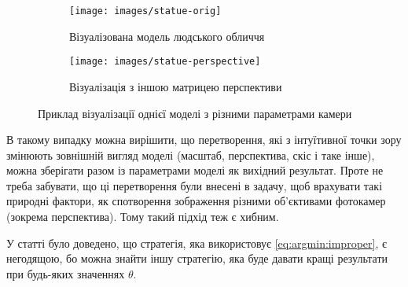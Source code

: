 \begin{figure}[h]
  \centering
  \begin{subfigure}[b]{0.4\textwidth}
    \centering
    \texttt{[image: images/statue-orig]}
    \caption{Візуалізована модель людського обличчя}
    \label{fig:argmin:statue-original}
  \end{subfigure}
  \begin{subfigure}[b]{0.4\textwidth}
    \centering
    \texttt{[image: images/statue-perspective]}
    \caption{Візуалізація з іншою матрицею перспективи}
    \label{fig:argmin:statue-distorted}
  \end{subfigure}
  \caption{Приклад візуалізації однієї моделі з різними параметрами камери}
\end{figure}

В такому випадку можна вирішити,
що перетворення, які з інтуїтивної точки зору змінюють зовнішній вигляд моделі
(масштаб, перспектива, скіс і таке інше),
можна зберігати разом із параметрами моделі як вихідний результат.
Проте не треба забувати, що ці перетворення були внесені в задачу,
щоб врахувати такі природні фактори,
як спотворення зображення різними об'єктивами фотокамер (зокрема перспектива).
Тому такий підхід теж є хибним.

У статті \cite{schlezinger:2013} було доведено,
що стратегія, яка використовує \eqref{eq:argmin:improper}, є негодящою,
бо можна знайти іншу стратегію,
яка буде давати кращі результати при будь-яких значеннях $\theta$.
